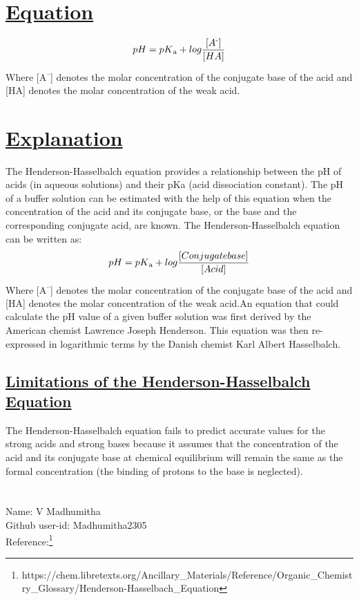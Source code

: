 \section*{\underline{Equation}}
\[ pH=pK\textsubscript{a}+log\frac{[A\textsuperscript{-}]}{[HA]}\]
Where [A\textsuperscript{–}] denotes the molar concentration of the conjugate base of the acid and [HA] denotes the molar concentration of the weak acid.
\section*{\underline{Explanation}}
The Henderson-Hasselbalch equation provides a relationship between the pH of acids (in aqueous solutions) and their pKa (acid dissociation constant). The pH of a buffer solution can be estimated with the help of this equation when the concentration of the acid and its conjugate base, or the base and the corresponding conjugate acid, are known.
The Henderson-Hasselbalch equation can be written as:
\[ pH=pK\textsubscript{a}+log\frac{[Conjugate  base]}{[Acid]}\]
Where [A\textsuperscript{–}] denotes the molar concentration of the conjugate base of the acid and [HA] denotes the molar concentration of the weak acid.An equation that could calculate the pH value of a given buffer solution was first derived by the American chemist Lawrence Joseph Henderson. This equation was then re-expressed in logarithmic terms by the Danish chemist Karl Albert Hasselbalch. 

\subsection*{\underline{Limitations of the Henderson-Hasselbalch Equation}}
The Henderson-Hasselbalch equation fails to predict accurate values for the strong acids and strong bases because it assumes that the concentration of the acid and its conjugate base at chemical equilibrium will remain the same as the formal concentration (the binding of protons to the base is neglected).
\section*{}
Name: V Madhumitha\\
Github user-id: Madhumitha2305\\
Reference:\footnote{https://chem.libretexts.org/Ancillary_Materials/Reference/Organic_Chemistry_Glossary/Henderson-Hasselbach_Equation}
